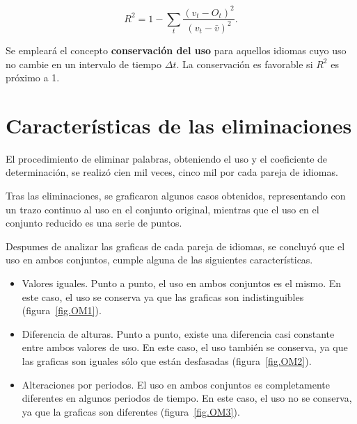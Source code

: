 \begin{equation}
\label{ec.dif_uso}
R^{2} = 1 - \sum_{t} \frac{ \left( v_{t}- O_{t} \right)^{2}  }{ \left( v_{t} - \bar{v} \right)^{2} }.
\end{equation}

Se empleará el concepto \textbf{conservación del uso} para aquellos idiomas cuyo uso no cambie en un intervalo de tiempo $\Delta t$. La conservación es favorable si $R^{2}$ es próximo a 1. 

\section{Características de las eliminaciones}

El procedimiento de eliminar palabras, obteniendo el uso y el coeficiente de determinación, se realizó cien mil veces, cinco mil por cada pareja de idiomas.

Tras las eliminaciones, se graficaron algunos casos obtenidos, representando con un trazo continuo al uso en el conjunto original, mientras que el uso en el conjunto reducido es una serie de puntos.

Despumes de analizar las graficas de cada pareja de idiomas, se concluyó  que el uso en ambos conjuntos, cumple alguna de las siguientes características.


\begin{itemize}
	
	\item Valores iguales. Punto a punto, el uso en ambos conjuntos es el mismo. En este caso, el uso se conserva ya que las graficas son indistinguibles (figura~\ref{fig.OM1}).
	
	\item Diferencia de alturas. Punto a punto, existe una diferencia casi constante entre ambos valores de uso. En este caso, el uso también se conserva, ya que las graficas son iguales sólo que están desfasadas (figura~\ref{fig.OM2}).  
	
	\item Alteraciones por periodos. El uso en ambos conjuntos es completamente diferentes en algunos periodos de tiempo. En este caso, el uso no se conserva, ya que la graficas son diferentes (figura~\ref{fig.OM3}).

\end{itemize}



